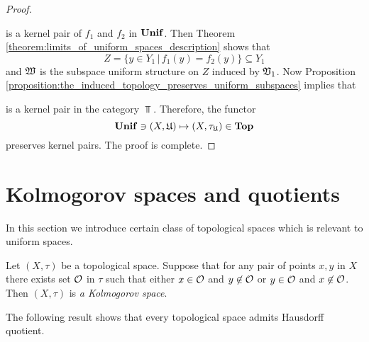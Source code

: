 \begin{proof}
\begin{center}
\end{center}
is a kernel pair of $f_1$ and $f_2$ in $\mathbf{Unif}$. Then Theorem \ref{theorem:limits_of_uniform_spaces_description} shows that 
$$Z = \big\{y \in Y_1\,\big|\,f_1(y) = f_2(y)\big\}\subseteq Y_1$$
and ${\mathfrak W}$ is the subspace uniform structure on $Z$ induced by ${\mathfrak V}_1$. Now Proposition \ref{proposition:the_induced_topology_preserves_uniform_subspaces} implies that
\begin{center}
\end{center}
is a kernel pair in the category $\Top$. Therefore, the functor
$$\mathbf{Unif} \ni (X,{\mathfrak U}) \mapsto (X,\tau_{{\mathfrak U}}) \in \mathbf{Top}$$
preserves kernel pairs. The proof is complete.
\end{proof}

\section{Kolmogorov spaces and quotients}
\noindent
In this section we introduce certain class of topological spaces which is relevant to uniform spaces.

\begin{definition}
Let $(X,\tau)$ be a topological space. Suppose that for any pair of points $x,y$ in $X$ there exists set ${\mathcal O}$ in $\tau$ such that either $x \in {\mathcal O}$ and $y \not \in {\mathcal O}$ or $y \in {\mathcal O}$ and $x \not \in {\mathcal O}$. Then $(X,\tau)$ is \textit{a Kolmogorov space}.
\end{definition}
\noindent
The following result shows that every topological space admits Hausdorff quotient.

